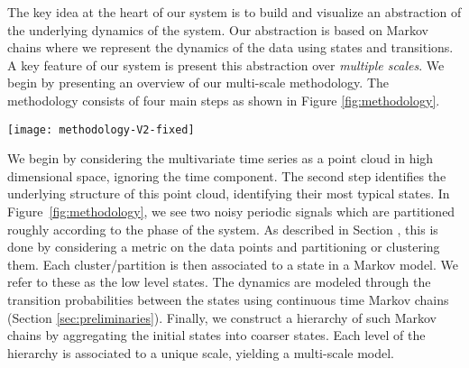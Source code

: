 \iffalse
\begin{itemize}
	\item Initial state construction (State Identification)
	\item Aggregation (State Aggregation)
	\item Transition probabililties (Modeling transitions)
\end{itemize}
\fi

The key idea at the heart of our system is to build and visualize an abstraction of the underlying 
dynamics of the system. Our abstraction is based on Markov chains where we represent the dynamics of the data using states and transitions. A key feature of our system is  present this abstraction over \emph{multiple scales}. 
%
%
We begin by presenting an overview
of our multi-scale methodology. The methodology consists of four main steps as shown in Figure \ref{fig:methodology}.
\begin{figure*}[]
	\centering
	\texttt{[image: methodology-V2-fixed]}
	\caption{Overview of the proposed three-step methodology.}
	\label{fig:methodology}
\end{figure*}

We begin by considering the multivariate time series as a point cloud in high dimensional space, ignoring the time component. The second step identifies the underlying structure of this point cloud, identifying their most typical states. In Figure~\ref{fig:methodology}, we see two noisy periodic signals which are partitioned roughly according to the phase of the system. As described in Section , this is done by considering a metric on the data points and partitioning or clustering them. Each cluster/partition is then associated to a state in a Markov model. We refer to these as the low level states. The 
 dynamics are modeled through the transition probabilities between the states using continuous time Markov chains (Section \ref{sec:preliminaries}). Finally, we construct a hierarchy of such Markov chains by aggregating the initial states into coarser states. Each level of the hierarchy is associated to a unique scale, yielding a multi-scale model.

